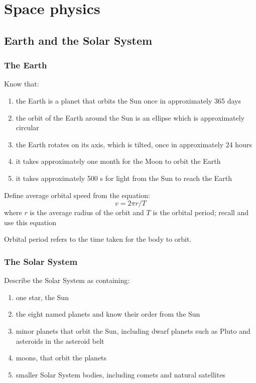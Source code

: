 \section{Space physics}
\subsection{Earth and the Solar System}
\subsubsection{The Earth}

\begin{subpoint}
Know that:

\begin{enumerate}[label=(\alph*)]
\item the Earth is a planet that orbits the Sun once in approximately 365 days
\item the orbit of the Earth around the Sun is an ellipse which is approximately circular
\item the Earth rotates on its axis, which is tilted, once in approximately 24 hours
\item it takes approximately one month for the Moon to orbit the Earth
\item it takes approximately 500 s for light from the Sun to reach the Earth
\end{enumerate}
\end{subpoint}

\begin{subpoint}
	Define average orbital speed from the equation:
	$$ v = 2\pi r / T$$
	where $r$ is the average radius of the orbit and $T$ is the orbital period;
	recall and use this equation
\end{subpoint}

Orbital period refers to the time taken for the body to orbit.

\subsubsection{The Solar System}
\begin{subpoint}
Describe the Solar System as containing:
\begin{enumerate}[label=(\alph*)]
\setlength\itemsep{0em}
\item one star, the Sun
\item the eight named planets and know their order from the Sun
\item minor planets that orbit the Sun, including dwarf planets such as Pluto and asteroids in the asteroid
belt
\item moons, that orbit the planets
\item smaller Solar System bodies, including comets and natural satellites
\end{enumerate}
\end{subpoint}

